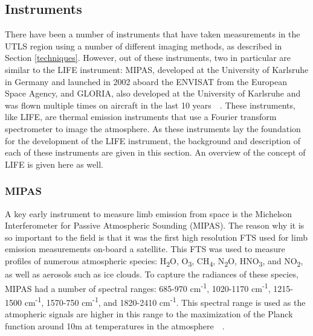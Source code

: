 \subsection{Instruments} \label{instruments} %
There have been a number of instruments that have taken measurements in the UTLS region using a number of different imaging methods, as described in Section \ref{techniques}. However, out of these instruments, two in particular are similar to the LIFE instrument: MIPAS, developed at the University of Karlsruhe in Germany and launched in 2002 aboard the ENVISAT from the European Space Agency, and GLORIA, also developed at the University of Karlsruhe and was flown multiple times on aircraft in the last 10 years~\citep{MIPAS_instrument}~\citep{GLORIA_concept}. These instruments, like LIFE, are thermal emission instruments that use a Fourier transform spectrometer to image the atmosphere. As these instruments lay the foundation for the development of the LIFE instrument, the background and description of each of these instruments are given in this section. An overview of the concept of LIFE is given here as well.

\subsubsection{MIPAS}
A key early instrument to measure limb emission from space is the Michelson Interferometer for Passive Atmospheric Sounding (MIPAS). The reason why it is so important to the field is that it was the first high resolution FTS used for limb emission measurements on-board a satellite. This FTS was used to measure profiles of numerous atmospheric species: H\textsubscript{2}O, O\textsubscript{3}, CH\textsubscript{4}, N\textsubscript{2}O, HNO\textsubscript{3}, and NO\textsubscript{2}, as well as aerosols such as ice clouds. To capture the radiances of these species, MIPAS had a number of spectral ranges: 685-970 cm\textsuperscript{-1}, 1020-1170 cm\textsuperscript{-1}, 1215-1500 cm\textsuperscript{-1}, 1570-750 cm\textsuperscript{-1}, and 1820-2410 cm\textsuperscript{-1}. This spectral range is used as the atmopheric signals are higher in this range to the maximization of the Planck function around 10\textmu m at temperatures in the atmosphere~\citep{MIPAS_instrument}~\citep{MIPAS_conference}.


